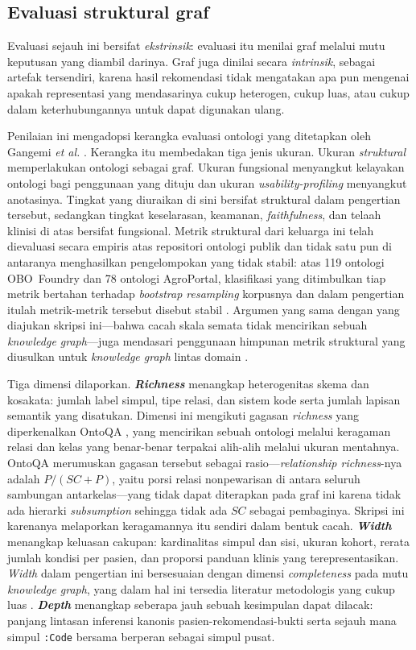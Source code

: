 \subsection{Evaluasi struktural graf}
\label{sec:structural}
Evaluasi sejauh ini bersifat \emph{ekstrinsik}: evaluasi itu menilai graf melalui mutu
keputusan yang diambil darinya. Graf juga dinilai secara \emph{intrinsik}, sebagai artefak
tersendiri, karena hasil rekomendasi tidak mengatakan apa pun mengenai apakah
representasi yang mendasarinya cukup heterogen, cukup luas, atau cukup dalam keterhubungannya
untuk dapat digunakan ulang.

Penilaian ini mengadopsi kerangka evaluasi ontologi yang ditetapkan oleh Gangemi \textit{et
al.} \cite{gangemi2006}. Kerangka itu membedakan tiga jenis ukuran. Ukuran \emph{struktural}
memperlakukan ontologi sebagai graf. Ukuran fungsional menyangkut kelayakan ontologi bagi
penggunaan yang dituju dan ukuran \emph{usability-profiling} menyangkut anotasinya. Tingkat
yang diuraikan di sini bersifat struktural dalam pengertian tersebut, sedangkan tingkat
keselarasan, keamanan, \emph{faithfulness}, dan telaah klinisi di atas bersifat fungsional. Metrik
struktural dari keluarga ini telah dievaluasi secara empiris atas repositori ontologi publik
dan tidak satu pun di antaranya menghasilkan pengelompokan yang tidak stabil: atas 119
ontologi OBO~Foundry dan 78 ontologi AgroPortal, klasifikasi yang ditimbulkan tiap metrik
bertahan terhadap \emph{bootstrap resampling} korpusnya dan dalam pengertian itulah
metrik-metrik tersebut disebut stabil \cite{franco2020}.
Argumen yang sama dengan yang diajukan skripsi ini---bahwa cacah skala semata tidak
mencirikan sebuah \emph{knowledge graph}---juga mendasari penggunaan himpunan metrik struktural yang
diusulkan untuk \emph{knowledge graph} lintas domain \cite{seo2022}.

Tiga dimensi dilaporkan. \textbf{\emph{Richness}} menangkap heterogenitas skema dan kosakata:
jumlah label simpul, tipe relasi, dan sistem kode serta jumlah lapisan semantik yang
disatukan. Dimensi ini mengikuti gagasan \emph{richness} yang diperkenalkan OntoQA
\cite{tartir2005}, yang mencirikan sebuah ontologi melalui keragaman relasi dan kelas yang
benar-benar terpakai alih-alih melalui ukuran mentahnya. OntoQA merumuskan gagasan tersebut
sebagai rasio---\emph{relationship richness}-nya adalah $P/(SC+P)$, yaitu porsi relasi nonpewarisan di antara seluruh sambungan antarkelas---yang tidak dapat diterapkan pada graf
ini karena tidak ada hierarki \emph{subsumption} sehingga tidak ada $SC$ sebagai
pembaginya. Skripsi ini karenanya melaporkan keragamannya itu sendiri dalam bentuk cacah. \textbf{\emph{Width}} menangkap
keluasan cakupan: kardinalitas simpul dan sisi, ukuran kohort, rerata jumlah kondisi per
pasien, dan proporsi panduan klinis yang terepresentasikan. \emph{Width} dalam pengertian ini
bersesuaian dengan dimensi \emph{completeness} pada mutu \emph{knowledge graph}, yang dalam hal ini
tersedia literatur metodologis yang cukup luas \cite{issa2021,xue2023}.
\textbf{\emph{Depth}} menangkap seberapa jauh sebuah kesimpulan dapat dilacak: panjang lintasan
inferensi kanonis pasien-rekomendasi-bukti serta sejauh mana simpul
\texttt{:Code} bersama berperan sebagai simpul pusat.

